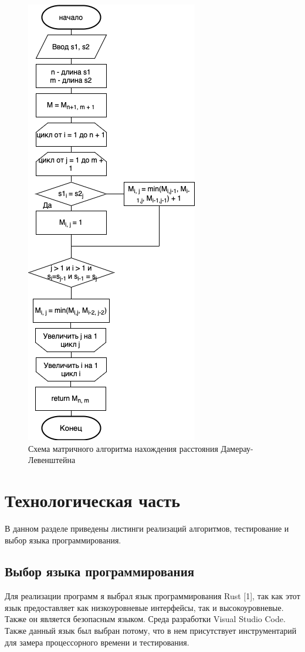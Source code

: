 \documentclass[14pt,russian]{scrartcl}
\begin{document}
\begin{figure}[h]
	\centering
	\includegraphics[width=0.5\linewidth]{dam_lev_iter.png}
	\caption{Схема матричного алгоритма нахождения расстояния Дамерау-Левенштейна}
	\label{fig:iter_dam_lev}
\end{figure}

\section{Технологическая часть}

В данном разделе приведены листинги реализаций алгоритмов, тестирование и выбор языка программирования.


\subsection{Выбор языка программирования}
Для реализации программ я выбрал язык программирования Rust [1], так как этот язык предоставляет как низкоуровневые интерфейсы, так и высокоуровневые. Также он является безопасным языком. Среда разработки Visual Studio Code. Также данный язык был выбран потому, что в нем присутствует инструментарий для замера процессорного времени и тестирования.
\end{document}
